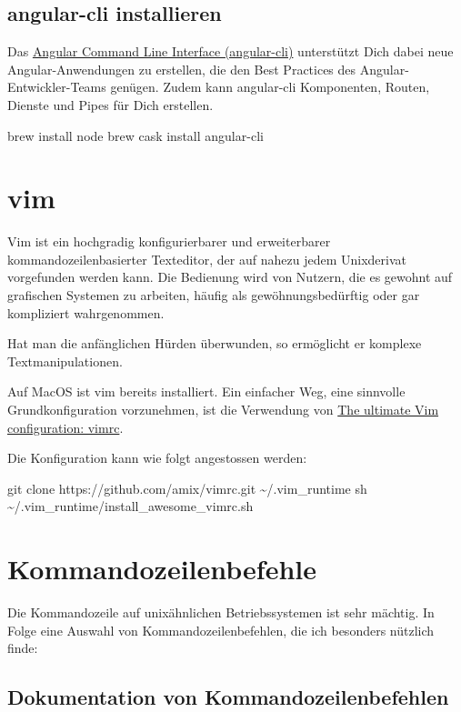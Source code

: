 \documentclass[]{article}
\begin{document}
\subsection{angular-cli installieren}
Das \href{https://cli.angular.io/}{Angular Command Line Interface (angular-cli)} unterstützt Dich dabei neue Angular-Anwendungen zu erstellen, die den Best Practices des Angular-Entwickler-Teams genügen. Zudem kann angular-cli Komponenten, Routen, Dienste und Pipes für Dich erstellen.

\begin{bashcode}
brew install node
brew cask install angular-cli
\end{bashcode}

\section{vim}
Vim ist ein hochgradig konfigurierbarer und erweiterbarer kommandozeilenbasierter Texteditor, der auf nahezu jedem Unixderivat vorgefunden werden kann. Die Bedienung wird von Nutzern, die es gewohnt auf grafischen Systemen zu arbeiten, häufig als gewöhnungsbedürftig oder gar kompliziert wahrgenommen. 

Hat man die anfänglichen Hürden überwunden, so  ermöglicht er komplexe Textmanipulationen.

Auf MacOS ist vim bereits installiert. Ein einfacher Weg, eine sinnvolle Grundkonfiguration vorzunehmen, ist die Verwendung von \href{https://github.com/amix/vimrc}{The ultimate Vim configuration: vimrc}.

Die Konfiguration kann wie folgt angestossen werden:

\begin{bashcode}
git clone https://github.com/amix/vimrc.git \~{}/.vim\_runtime
sh \~{}/.vim\_runtime/install\_awesome\_vimrc.sh
\end{bashcode}

\section{Kommandozeilenbefehle}
Die Kommandozeile auf unixähnlichen Betriebssystemen ist sehr mächtig. 
In Folge eine Auswahl von Kommandozeilenbefehlen, die ich besonders nützlich finde:

\subsection{Dokumentation von Kommandozeilenbefehlen}
\end{document}
